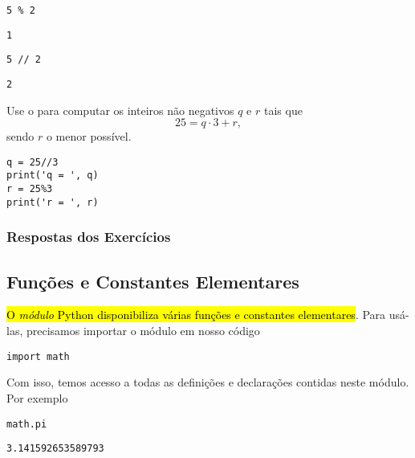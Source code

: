 \begin{lstlisting}
5 % 2
\end{lstlisting}

\begin{verbatim}
1
\end{verbatim}

\begin{lstlisting}
5 // 2
\end{lstlisting}

\begin{verbatim}
2
\end{verbatim}

\begin{exer}
  Use o {\python} para computar os inteiros não negativos $q$ e $r$ tais que
  \begin{equation}
    25 = q\cdot 3 + r,
  \end{equation}
  sendo $r$ o menor possível.
\end{exer}
\begin{resp}

\begin{lstlisting}
q = 25//3
print('q = ', q)
r = 25%3
print('r = ', r)
\end{lstlisting}

\end{resp}

\ifisbook 
\subsubsection*{Respostas dos Exercícios}
\shipoutAnswer
\fi


\subsection{Funções e Constantes Elementares}

\hl{O \emph{módulo} Python {\PYTHONmath} disponibiliza várias funções e constantes elementares}. Para usá-las, precisamos importar o módulo em nosso código

\begin{lstlisting}
import math
\end{lstlisting}

Com isso, temos acesso a todas as definições e declarações contidas neste módulo. Por exemplo

\begin{lstlisting}
math.pi
\end{lstlisting}

\begin{verbatim}
3.141592653589793
\end{verbatim}

